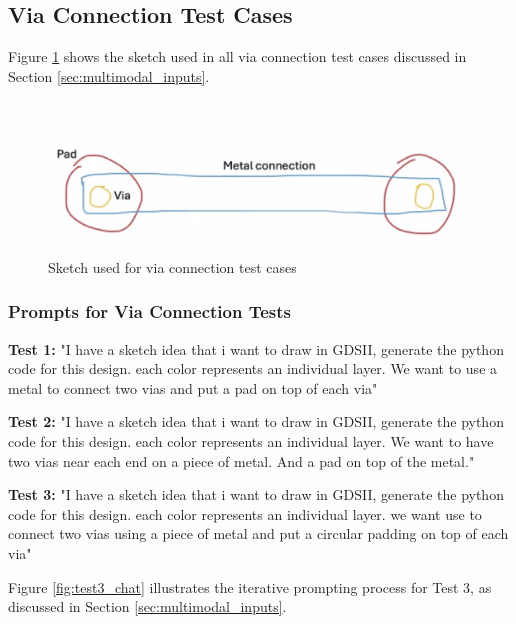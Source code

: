 \documentclass{article}
\begin{document}
\subsection{Via Connection Test Cases}
\label{appendix:via_connection}

Figure \ref{fig:sketch} shows the sketch used in all via connection test cases discussed in Section \ref{sec:multimodal_inputs}.

\begin{figure}[h]
\centering
\includegraphics[width=0.5\linewidth]{sketch.png}
\caption{Sketch used for via connection test cases}
\label{fig:sketch}
\end{figure}

\subsubsection{Prompts for Via Connection Tests}
\label{appendix:via_prompts}

\textbf{Test 1:} "I have a sketch idea that i want to draw in GDSII, generate the python code for this design. each color represents an individual layer. We want to use a metal to connect two vias and put a pad on top of each via"

\textbf{Test 2:} "I have a sketch idea that i want to draw in GDSII, generate the python code for this design. each color represents an individual layer. We want to have two vias near each end on a piece of metal. And a pad on top of the metal."

\textbf{Test 3:} "I have a sketch idea that i want to draw in GDSII, generate the python code for this design. each color represents an individual layer. we want use to connect two vias using a piece of metal and put a circular padding on top of each via"

Figure \ref{fig:test3_chat} illustrates the iterative prompting process for Test 3, as discussed in Section \ref{sec:multimodal_inputs}.
\end{document}
